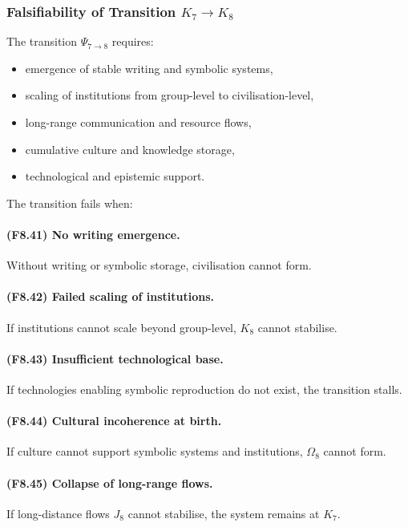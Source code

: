 \subsubsection{Falsifiability of Transition \texorpdfstring{$K_7 \to K_8$}{K_7 \to K_8}}

The transition $\Psi_{7\to 8}$ requires:

\begin{itemize}
    \item emergence of stable writing and symbolic systems,
    \item scaling of institutions from group-level to civilisation-level,
    \item long-range communication and resource flows,
    \item cumulative culture and knowledge storage,
    \item technological and epistemic support.
\end{itemize}

The transition fails when:

\paragraph{(F8.41) No writing emergence.}
Without writing or symbolic storage,
civilisation cannot form.

\paragraph{(F8.42) Failed scaling of institutions.}
If institutions cannot scale beyond group-level,
$K_8$ cannot stabilise.

\paragraph{(F8.43) Insufficient technological base.}
If technologies enabling symbolic reproduction do not exist,
the transition stalls.

\paragraph{(F8.44) Cultural incoherence at birth.}
If culture cannot support symbolic systems and institutions,
$\Omega_8$ cannot form.

\paragraph{(F8.45) Collapse of long-range flows.}
If long-distance flows $J_8$ cannot stabilise,
the system remains at $K_7$.




